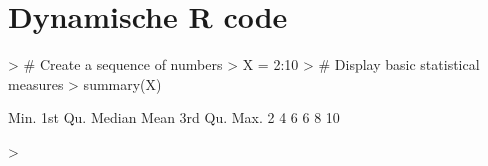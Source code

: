\documentclass[a4paper,12pt, dutch, oneside ]{book}
\begin{document}

\section{Dynamische R code}
\begin{Schunk}
\begin{Sinput}
> # Create a sequence of numbers
> X = 2:10
> # Display basic statistical measures
> summary(X)
\end{Sinput}
\begin{Soutput}
   Min. 1st Qu.  Median    Mean 3rd Qu.    Max. 
      2       4       6       6       8      10 
\end{Soutput}
\begin{Sinput}
> 
\end{Sinput}
\end{Schunk}
\end{document}
